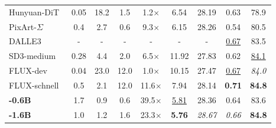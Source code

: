 \begin{table}[t]
{{\begin{tabular}{lcccccccc}
    Hunyuan-DiT~\citep{li2024hunyuan}       & 0.05  & 18.2  & 1.5   & 1.2$\times$     & 6.54              & 28.19             & 0.63              & 78.9 \\ 
    PixArt-$\Sigma$~\citep{chen2024pixart}  & 0.4   & 2.7   & 0.6   & 9.3$\times$     & 6.15              & 28.26             & 0.54              & 80.5 \\
    DALLE3~\citep{Dalle-3}                  & -     & -     & -     & -               & -                 & -                 & \underline{0.67}  & 83.5 \\
    SD3-medium~\citep{esser2024scaling}     & 0.28  & 4.4   & 2.0   & 6.5$\times$     & 11.92             & 27.83             & 0.62              & \underline{84.1} \\
    FLUX-dev~\citep{FLUX}                   & 0.04  & 23.0  & 12.0  & 1.0$\times$     & 10.15             & 27.47             & \underline{0.67}  & \textit{84.0} \\
    FLUX-schnell~\citep{FLUX}               & 0.5   & 2.1   & 12.0  & 11.6$\times$    & 7.94              & 28.14             & \textbf{0.71}     & \textbf{84.8} \\
    \midrule
    \textbf{\model{}-0.6B}                  & 1.7   & 0.9   & 0.6   & 39.5$\times$    & \underline{5.81}  & 28.36             & 0.64              & 83.6 \\
    \textbf{\model{}-1.6B}                  & 1.0   & 1.2   & 1.6   & 23.3$\times$    & \textbf{5.76}     & \textit{28.67}    & \textit{0.66}     & \textbf{84.8} \\
    \bottomrule
    \end{tabular}
    }
    }
    \vspace{-2em}
\end{table}
